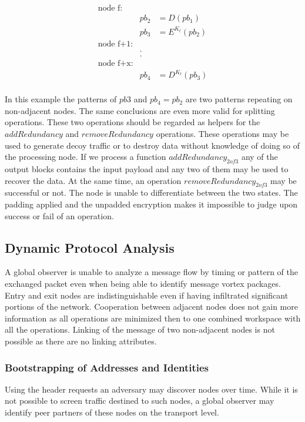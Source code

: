 \documentclass[10pt,journal,compsoc]{IEEEtran}
\begin{document}
\begin{eqnarray*}
\text{node f:}\\
	& pb_2 & = D(pb_1)\\
	& pb_3 & = E^{K_t}(pb_2)\\
\text{node f+1:}\\
	&.\\
	&.\\	
\text{node f+x:}\\
	& pb_4 & = D^{K_t}(pb_3)\\
\end{eqnarray*}

In this example the patterns of $pb3$ and $pb_4=pb_2$ are two patterns repeating on non-adjacent nodes. The same conclusions are even more valid for splitting operations. These two operations should be regarded as helpers for the $addRedundancy$ and $removeRedundancy$ operations. These operations may be used to generate decoy traffic or to destroy data without knowledge of doing so of the processing node. If we process a function $addRedundancy_{2 of 3}$ any of the output blocks contains the input payload and any two of them may be used to recover the data. At the same time, an operation $removeRedundancy_{2 of 3}$ may be successful or not. The node is unable to differentiate between the two states. The padding applied and the unpadded encryption makes it impossible to judge upon success or fail of an operation.

\subsection{Dynamic Protocol Analysis\label{sec:dynamicAnalysis}}
A global observer is unable to analyze a message flow by timing or pattern of the exchanged packet even when being able to identify message vortex packages. Entry and exit nodes are indistinguishable even if having infiltrated significant portions of the network. Cooperation between adjacent nodes does not gain more information as all operations are minimized then to one combined workspace with all the operations. Linking of the message of two non-adjacent nodes is not possible as there are no linking attributes.

\subsubsection{Bootstrapping of Addresses and Identities}
Using the header requests an adversary may discover nodes over time. While it is not possible to screen traffic destined to such nodes, a global observer may identify peer partners of these nodes on the transport level.
\end{document}
